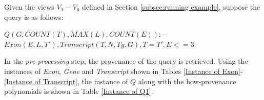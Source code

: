 \begin{example}
Given the views $V_1-V_6$ defined in Section \ref{subsec:running example}, suppose the query is as follows:
\begin{tabbing}
$Q(G, COUNT(T), MAX(L), COUNT(E)):-$\\
$Exon(E, L, T'),Transcript(T, N, Ty, G), T = T', E <= 3$
\end{tabbing}
In the {\em pre-processing} step,  the provenance of the query is retrieved. Using the instances of {\em Exon}, {\em Gene} and {\em Transcript} shown in Tables \ref{Instance of Exon}-\ref{Instance of Transcript}, the instance of $Q$ along with the how-provenance polynomials is shown in Table \ref{Instance of Q1}. 


\end{example}
